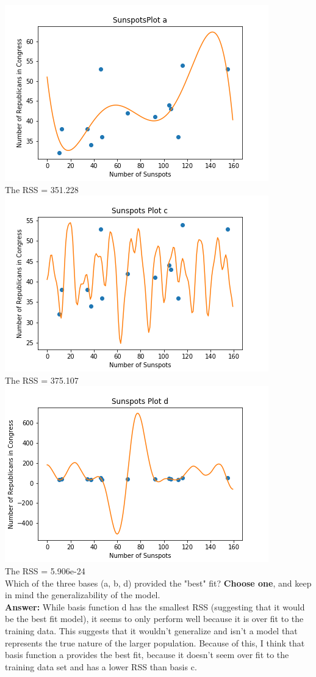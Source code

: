 \documentclass[submit]{harvardml}
\begin{document}
\begin{enumerate}
\includegraphics[width=.5\textwidth]{SunspotsPlot a.png}\\
The RSS = 351.228\\
\includegraphics[width=.5\textwidth]{hw1/Sunspots Plot c.png}\\
The RSS = 375.107\\
\includegraphics[width=.5\textwidth]{hw1/Sunspots Plot d.png}\\
The RSS = 5.906e-24\\

Which of the three bases (a, b, d) provided the "best" fit? \textbf{Choose one}, and keep in mind the generalizability of the model.\\ 

\textbf{Answer:} While basis function d has the smallest RSS (suggesting that it would be the best fit model), it seems to only perform well because it is over fit to the training data. This suggests that it wouldn't generalize and isn't a model that represents the true nature of the larger population. Because of this, I think that basis function a provides the best fit, because it doesn't seem over fit to the training data set and has a lower RSS than basis c.\\


\end{enumerate}
\end{document}
